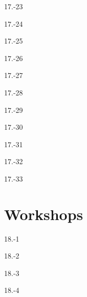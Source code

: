 \begin{exsol@solution}{17.-23}
\end{exsol@solution}
\begin{exsol@solution}{17.-24}
\end{exsol@solution}
\begin{exsol@solution}{17.-25}
\end{exsol@solution}
\begin{exsol@solution}{17.-26}
\end{exsol@solution}
\begin{exsol@solution}{17.-27}
\end{exsol@solution}
\begin{exsol@solution}{17.-28}

\end{exsol@solution}
\begin{exsol@solution}{17.-29}
\end{exsol@solution}
\begin{exsol@solution}{17.-30}
\end{exsol@solution}
\begin{exsol@solution}{17.-31}
\end{exsol@solution}
\begin{exsol@solution}{17.-32}
\end{exsol@solution}
\begin{exsol@solution}{17.-33}

\end{exsol@solution}
\setcounter{chapter}{17}\chapter{Workshops}
\begin{exsol@solution}{18.-1}
\end{exsol@solution}
\begin{exsol@solution}{18.-2}
\end{exsol@solution}
\begin{exsol@solution}{18.-3}
\end{exsol@solution}
\begin{exsol@solution}{18.-4}

\end{exsol@solution}
